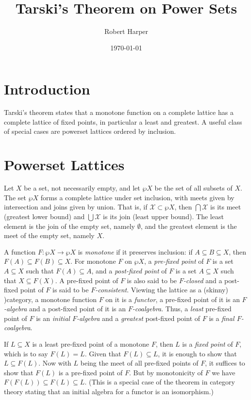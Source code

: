\documentclass[11pt,twoside]{article}
\begin{document}
\title{Tarski's Theorem on Power Sets}
\author{Robert Harper}
\date{\today}

\maketitle{}

\section{Introduction}

Tarski's theorem states that a monotone function on a complete lattice has a
complete lattice of fixed points, in particular a least and greatest. A useful
class of special cases are powerset lattices ordered by inclusion.

\section{Powerset Lattices}

Let $X$ be a set, not necessarily empty, and let $\wp{X}$ be the set of all
subsets of $X$. The set $\wp{X}$ forms a complete lattice under set inclusion,
with meets given by intersection and joins given by union. That is, if
$\mathcal{X}\subset\wp{X}$, then $\bigcap{\mathcal{X}}$ is its meet (greatest lower bound) and
$\bigcup{\mathcal{X}}$ is its join (least upper bound). The least element is the join
of the empty set, namely $\emptyset$, and the greatest element is the meet of the empty
set, namely $X$.

A function $F:\wp{X}\to\wp{X}$ is \emph{monotone} if it preserves inclusion: if
$A\subseteq B\subseteq X$, then $F(A)\subseteq F(B)\subseteq X$. For monotone
$F$ on $\wp{X}$, a \emph{pre-fixed point} of $F$ is a set $A\subseteq X$ such that
$F(A)\subseteq A$, and a \emph{post-fixed point} of $F$ is a set $A\subseteq X$ such that
$X\subseteq F(X)$. A pre-fixed point of $F$ is also said to be \emph{$F$-closed} and a
post-fixed point of $F$ is said to be \emph{$F$-consistent}. Viewing the lattice
as a (skinny) )category, a monotone function $F$ on it is a \emph{functor}, a
pre-fixed point of it is an \emph{$F$-algebra} and a post-fixed point of it is
an \emph{$F$-coalgebra}. Thus, a \emph{least} pre-fixed point of $F$ is an
\emph{initial $F$-algebra} and a \emph{greatest} post-fixed point of $F$ is a
\emph{final $F$-coalgebra}.

If $L\subseteq X$ is a least pre-fixed point of a monotone $F$, then $L$ is a
\emph{fixed point} of $F$, which is to say $F(L)=L$. Given that
$F(L)\subseteq L$, it is enough to show that $L\subseteq F(L)$. Now with $L$ being the meet of
all pre-fixed points of $F$, it suffices to show that $F(L)$ is a pre-fixed
point of $F$. But by monotonicity of $F$ we have
$F(F(L))\subseteq F(L)\subseteq L$. (This is a special case of the theorem in category
theory stating that an initial algebra for a functor is an isomorphism.)
\end{document}
